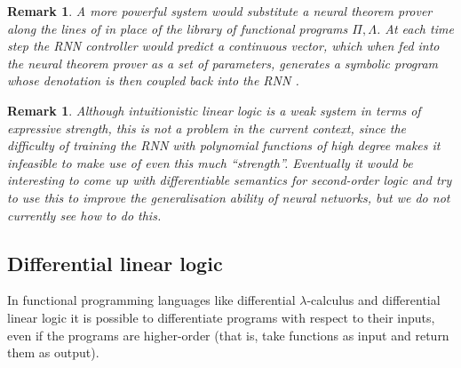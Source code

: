 \documentclass[english,letter paper,12pt,leqno]{article}
\theoremstyle{example}
\newtheorem{remark}[theorem]{Remark}
\numberwithin{equation}{section}
\DeclareMathOperator{\End}{End}
\begin{document}

\begin{remark} A more powerful system would substitute a neural theorem prover along the lines of \cite{alemi,ntp} in place of the library of functional programs $\Pi, \Lambda$. At each time step the RNN controller would predict a continuous vector, which when fed into the neural theorem prover as a set of parameters, generates a symbolic program whose denotation is then coupled back into the RNN \cite{tarlow}.
\end{remark}

\begin{remark} Although intuitionistic linear logic is a weak system in terms of expressive strength, this is not a problem in the current context, since the difficulty of training the RNN with polynomial functions of high degree makes it infeasible to make use of even this much ``strength''. Eventually it would be interesting to come up with differentiable semantics for second-order logic and try to use this to improve the generalisation ability of neural networks, but we do not currently see how to do this.
\end{remark}

\subsection{Differential linear logic}\label{section:differential_linear}

In functional programming languages like differential $\lambda$-calculus \cite{difflambda} and differential linear logic \cite{ehrhard-survey} it is possible to differentiate programs with respect to their inputs, even if the programs are higher-order (that is, take functions as input and return them as output). 
\end{document}

